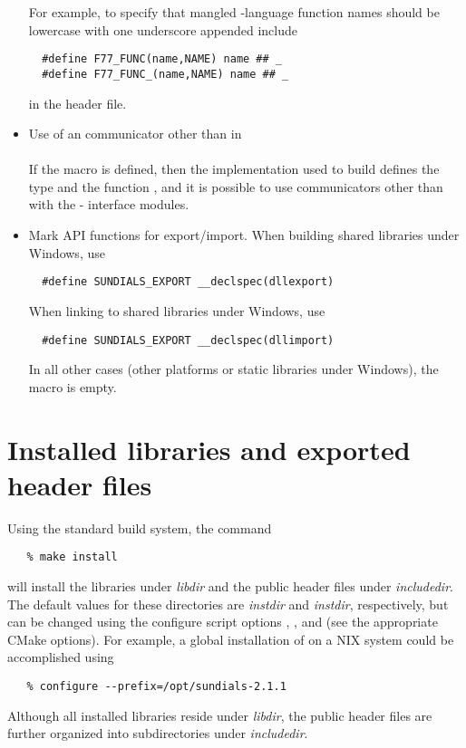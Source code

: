 \begin{itemize}
  For example, to specify that mangled {\C}-language function names
  should be lowercase with one underscore appended include
\begin{verbatim}
  #define F77_FUNC(name,NAME) name ## _
  #define F77_FUNC_(name,NAME) name ## _
\end{verbatim}
  in the  header file.

\item Use of an {\mpi} communicator other than  in {\F}\\ \\
  If the macro  is defined, then the
  {\mpi} implementation used to build {\sundials} defines the type
   and the function , and it is
  possible to use {\mpi} communicators other than
   with the {\F}-{\C} interface modules.

\item Mark {\sundials} API functions for export/import.
  When building shared {\sundials} libraries under Windows, use
\begin{verbatim}
  #define SUNDIALS_EXPORT __declspec(dllexport)
\end{verbatim}
  When linking to shared {\sundials} libraries under Windows, use
\begin{verbatim}
  #define SUNDIALS_EXPORT __declspec(dllimport)
\end{verbatim}
  In all other cases (other platforms or static libraries under Windows), 
  the  macro is empty.

\end{itemize}


\section{Installed libraries and exported header files}

Using the standard {\sundials} build system, the command
\begin{verbatim}
   % make install
\end{verbatim}
will install the libraries under {\em libdir} and the public header
files under {\em includedir}. The default values for these directories are
{\em instdir} and {\em instdir},
respectively, but can be changed using the configure script options
, ,  and  
(see the appropriate CMake options).  For example, a global installation
of {\sundials} on a {\sc *NIX} system could be accomplished using
\begin{verbatim}
   % configure --prefix=/opt/sundials-2.1.1
\end{verbatim}
Although all installed libraries reside under {\em libdir}, the public header files
are further organized into subdirectories under {\em includedir}.

